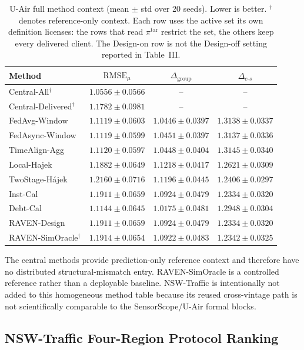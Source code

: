 \begin{table}[t]
\centering
\caption{U-Air full method context (mean $\pm$ std over 20 seeds).
Lower is better.  $^\dagger$ denotes reference-only context.
Each row uses the active set its own definition licenses: the rows that read
$\pi^{\mathrm{tar}}$ restrict the set, the others keep every delivered client.
The Design-on row is not the Design-off setting reported in Table~III.}
\label{tab:app_e3_uair}
\scriptsize
\setlength{\tabcolsep}{3pt}
\begin{tabular*}{\textwidth}{@{\extracolsep{\fill}}lccc}
\toprule
Method & $\mathrm{RMSE}_{\mu}$ & $\Delta_{\mathrm{group}}$ & $\Delta_{c\text{-}s}$\\
\midrule
Central-All$^{\dagger}$ & $1.0556\pm0.0566$ & -- & -- \\
Central-Delivered$^{\dagger}$ & $1.1782\pm0.0981$ & -- & -- \\
FedAvg-Window & $1.1119\pm0.0603$ & $1.0446\pm0.0397$ & $1.3138\pm0.0337$ \\
FedAsync-Window & $1.1119\pm0.0599$ & $1.0451\pm0.0397$ & $1.3137\pm0.0336$ \\
TimeAlign-Agg & $1.1120\pm0.0597$ & $1.0448\pm0.0404$ & $1.3145\pm0.0340$ \\
Local-Hajek & $1.1882\pm0.0649$ & $1.1218\pm0.0417$ & $1.2621\pm0.0309$ \\
TwoStage-H\'ajek & $1.2160\pm0.0716$ & $1.1196\pm0.0445$ & $1.2406\pm0.0297$ \\
Inst-Cal & $1.1911\pm0.0659$ & $1.0924\pm0.0479$ & $1.2334\pm0.0320$ \\
Debt-Cal & $1.1144\pm0.0645$ & $1.0175\pm0.0481$ & $1.2948\pm0.0304$ \\
RAVEN-Design & $1.1911\pm0.0659$ & $1.0924\pm0.0479$ & $1.2334\pm0.0320$ \\
RAVEN-SimOracle$^{\dagger}$ & $1.1914\pm0.0654$ & $1.0922\pm0.0483$ & $1.2342\pm0.0325$ \\
\bottomrule
\end{tabular*}
\end{table}

The central methods provide prediction-only reference context and therefore
have no distributed structural-mismatch entry.  RAVEN-SimOracle is a controlled
reference rather than a deployable baseline.  NSW-Traffic is intentionally not
added to this homogeneous method table because its reused cross-vintage path is not
scientifically comparable to the SensorScope/U-Air formal blocks.

\subsection{NSW-Traffic Four-Region Protocol Ranking}
\label{app:traffic_four_region}

